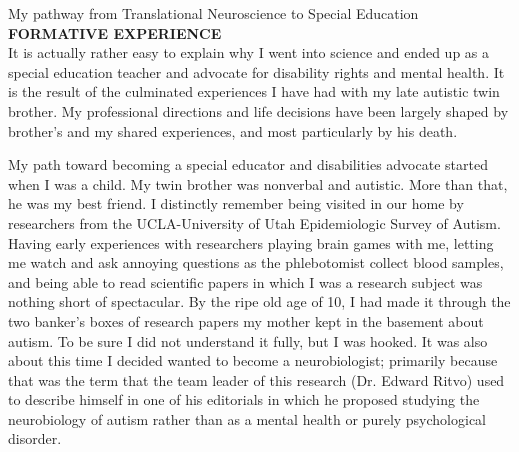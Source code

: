 \documentclass{resume} %
\begin{document}

\begin{rSection}{My pathway from Translational Neuroscience to Special Education}
{\bf FORMATIVE EXPERIENCE}\\
It is actually rather easy to explain why I went into science and ended up as a special education teacher and advocate for disability rights and mental health. It is the result of the culminated experiences I have had with my late autistic twin brother. My professional directions and life decisions have been largely shaped by brother’s and my shared experiences, and most particularly by his death.

My path toward becoming a special educator and disabilities advocate started when I was a child. My twin brother was nonverbal and autistic. More than that, he was my best friend. I distinctly remember being visited in our home by researchers from the UCLA-University of Utah Epidemiologic Survey of Autism. Having early experiences with researchers playing brain games with me, letting me watch and ask annoying questions as the phlebotomist collect blood samples, and being able to read scientific papers in which I was a research subject was nothing short of spectacular. By the ripe old age of 10, I had made it through the two banker’s boxes of research papers my mother kept in the basement about autism. To be sure I did not understand it fully, but I was hooked. It was also about this time I decided wanted to become a neurobiologist; primarily because that was the term that the team leader of this research (Dr. Edward Ritvo) used to describe himself in one of his editorials in which he proposed studying the neurobiology of autism rather than as a mental health or purely psychological disorder.


\end{rSection}
\end{document}
